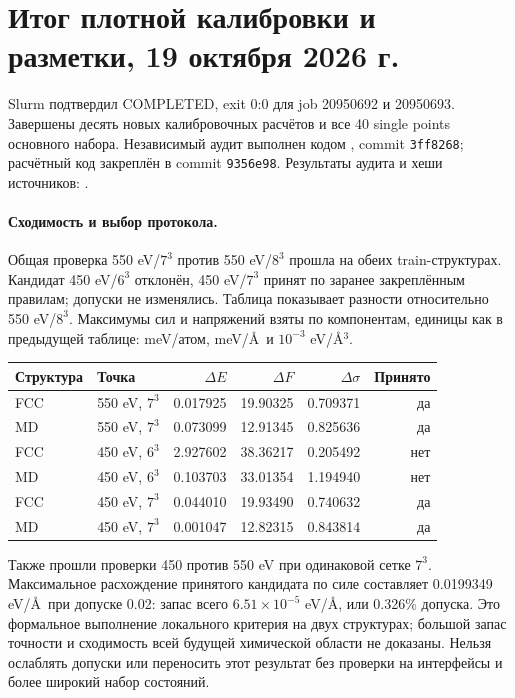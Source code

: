 \documentclass[11pt,a4paper]{article}
\begin{document}
\section{Итог плотной калибровки и разметки, 19 октября 2026 г.}
\label{sec:final}
Slurm подтвердил COMPLETED, exit 0:0 для job 20950692 и 20950693.
Завершены десять новых калибровочных расчётов и все 40 single points
основного набора. Независимый аудит выполнен кодом
, commit \texttt{3ff8268};
расчётный код закреплён в commit \texttt{9356e98}.
Результаты аудита и хеши источников:
.

\paragraph{Сходимость и выбор протокола.}
Общая проверка 550 eV/$7^3$ против 550 eV/$8^3$ прошла на обеих
train-структурах. Кандидат 450 eV/$6^3$ отклонён, 450 eV/$7^3$ принят
по заранее закреплённым правилам; допуски не изменялись.
Таблица показывает разности относительно 550 eV/$8^3$.
Максимумы сил и напряжений взяты по компонентам, единицы как в предыдущей
таблице: meV/атом, meV/\AA\ и $10^{-3}$ eV/\AA$^3$.
\begin{center}
\small
\begin{tabular}{llrrrr}
\toprule
Структура & Точка & $\Delta E$ & $\Delta F$ & $\Delta\sigma$ & Принято\\
\midrule
FCC & 550 eV, $7^3$ & 0.017925 & 19.90325 & 0.709371 & да\\
MD & 550 eV, $7^3$ & 0.073099 & 12.91345 & 0.825636 & да\\
FCC & 450 eV, $6^3$ & 2.927602 & 38.36217 & 0.205492 & нет\\
MD & 450 eV, $6^3$ & 0.103703 & 33.01354 & 1.194940 & нет\\
FCC & 450 eV, $7^3$ & 0.044010 & 19.93490 & 0.740632 & да\\
MD & 450 eV, $7^3$ & 0.001047 & 12.82315 & 0.843814 & да\\
\bottomrule
\end{tabular}
\end{center}
Также прошли проверки 450 против 550 eV при одинаковой сетке $7^3$.
Максимальное расхождение принятого кандидата по силе составляет
0.0199349 eV/\AA\ при допуске 0.02: запас всего
$6.51\times10^{-5}$ eV/\AA, или 0.326\% допуска.
Это формальное выполнение локального критерия на двух структурах;
большой запас точности и сходимость всей будущей химической области не доказаны.
Нельзя ослаблять допуски или переносить этот результат без проверки
на интерфейсы и более широкий набор состояний.
\end{document}
